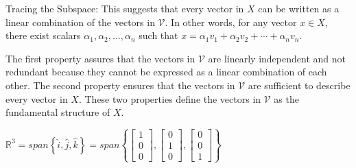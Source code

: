 \documentclass{article}
\begin{document}
{\begin{center}
{		Tracing the Subspace: This suggests that every vector in $X$ can be written as a linear combination of the vectors in $\mathcal{V}$. In other words, for any vector $x\in X$, there exist scalars $\alpha_1,\alpha_2,\ldots,\alpha_n$ such that $x=\alpha_1v_1+\alpha_2v_2+\cdots+\alpha_nv_n$.
		
	The first property assures that the vectors in $\mathcal{V}$ are linearly independent and not redundant because they cannot be expressed as a linear combination of each other. The second property ensures that the vectors in $\mathcal{V}$ are sufficient to describe every vector in $X$. These two properties define the vectors in $\mathcal{V}$ as the fundamental structure of $X$.
		
	}
\end{center}
\begin{center}
$\mathbb{R}^3 = span\left\{\hat{i},\hat{j},\hat{k}\right\} = span\left\{
\begin{bmatrix} 
	1 \\
	0 \\
	0
	\end{bmatrix},
\begin{bmatrix}
	0 \\
	1 \\
	0
\end{bmatrix},
\begin{bmatrix}
	0 \\
	0 \\
	1
\end{bmatrix}
\right\}
$
\end{center}
}
\end{document}
